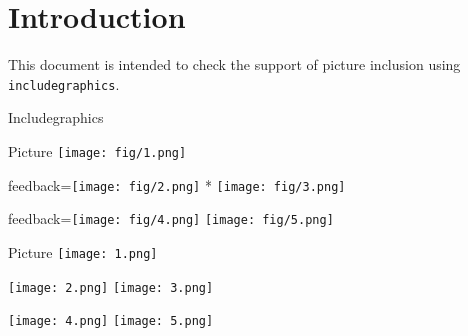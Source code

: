 \documentclass{article}
\begin{document}
\section*{Introduction}

This document is intended to check the support of picture inclusion using 
\texttt{includegraphics}.

\begin{quiz}{Includegraphics}

\begin{multi}{Picture}
\texttt{[image: fig/1.png]}
\item[feedback={\texttt{[image: fig/2.png]}}]* \texttt{[image: fig/3.png]}
\item[feedback={\texttt{[image: fig/4.png]}}] \texttt{[image: fig/5.png]}
\end{multi}

\graphicspath{{./fig/}}

\begin{matching}[dd]{Picture}
\texttt{[image: 1.png]}
\item \texttt{[image: 2.png]} \answer \texttt{[image: 3.png]}
\item \texttt{[image: 4.png]} \answer \texttt{[image: 5.png]}
\end{matching}

\end{quiz}
\end{document}
